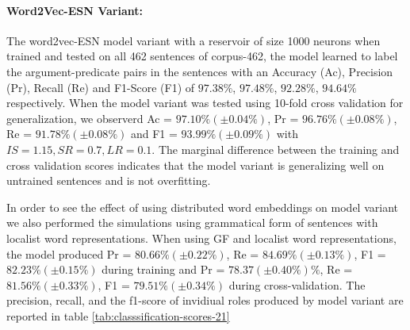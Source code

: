 \paragraph{Word2Vec-ESN Variant:} The word2vec-ESN model variant with a reservoir of size 1000 neurons when trained and tested on all 462 sentences of corpus-462, the model learned to label the argument-predicate pairs in the sentences with an Accuracy (Ac), Precision (Pr), Recall (Re) and F1-Score (F1) of $97.38\%$,  $97.48\%$, $92.28\%$, $94.64\%$ respectively. When the model variant was tested using 10-fold cross validation for generalization, we observerd Ac = $97.10\% (\pm 0.04\%)$, Pr = $96.76\% (\pm 0.08\%)$, Re = $91.78\% (\pm 0.08\%)$ and F1 = $93.99\%(\pm 0.09\%)$ with $ IS=1.15, SR = 0.7, LR = 0.1$. The marginal difference between the training and cross validation scores indicates that the model variant is generalizing well on untrained sentences and is not overfitting. 

In order to see the effect of using distributed word embeddings on model variant we  also performed the simulations using grammatical form of sentences with localist word representations. When using GF and localist word representations, the model produced Pr = $80.66 \% (\pm 0.22\%)$, Re = $84.69 \% (\pm 0.13\%)$, F1 = $82.23 \% (\pm 0.15\%)$ during training and Pr = $78.37 (\pm 0.40\%)\% $, Re = $81.56 \% (\pm 0.33\%)$, F1 = $79.51 \% (\pm 0.34\%)$ during cross-validation. The precision, recall, and the f1-score of invidiual roles produced by model variant are reported in table \ref{tab:classsification-scores-21} 

